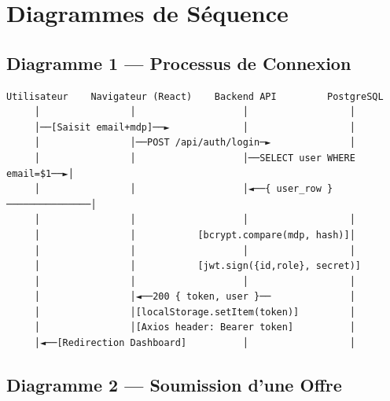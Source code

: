 \documentclass[12pt,a4paper]{report}
\begin{document}
\chapter{Diagrammes de Séquence}

\section{Diagramme 1 — Processus de Connexion}

\begin{verbatim}
Utilisateur    Navigateur (React)    Backend API         PostgreSQL
     │                │                   │                  │
     │──[Saisit email+mdp]──►             │                  │
     │                │──POST /api/auth/login─►              │
     │                │                   │──SELECT user WHERE email=$1──►│
     │                │                   │◄──{ user_row }───────────────│
     │                │                   │                  │
     │                │           [bcrypt.compare(mdp, hash)]│
     │                │                   │                  │
     │                │           [jwt.sign({id,role}, secret)]
     │                │                   │                  │
     │                │◄──200 { token, user }──              │
     │                │[localStorage.setItem(token)]         │
     │                │[Axios header: Bearer token]          │
     │◄──[Redirection Dashboard]          │                  │
\end{verbatim}

\section{Diagramme 2 — Soumission d'une Offre}
\end{document}
